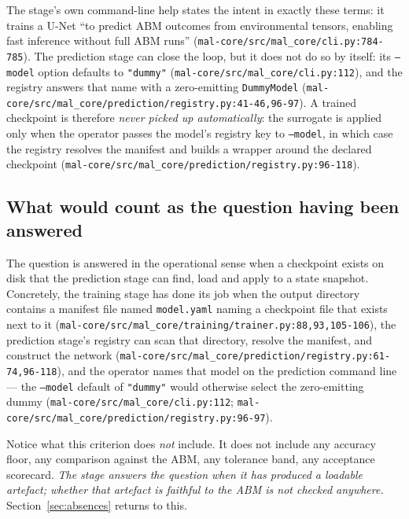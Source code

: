\documentclass[11pt,a4paper]{article}
\newcommand{\codex}[1]{\texttt{#1}}
\begin{document}
The stage's own command-line help states the intent in exactly these terms:
it trains a U-Net ``to predict ABM outcomes from environmental tensors,
enabling fast inference without full ABM runs''
(\codex{mal-core/\allowbreak{}src/\allowbreak{}mal\_\allowbreak{}core/\allowbreak{}cli.py:784-785}). The prediction stage can close the
loop, but it does not do so by itself: its \codex{--model} option defaults to
\codex{"dummy"}
(\codex{mal-core/\allowbreak{}src/\allowbreak{}mal\_\allowbreak{}core/\allowbreak{}cli.py:112}), and the registry answers that name with a
zero-emitting \codex{DummyModel}
(\codex{mal-core/\allowbreak{}src/\allowbreak{}mal\_\allowbreak{}core/\allowbreak{}prediction/\allowbreak{}registry.py:41-46,96-97}). A trained
checkpoint is therefore \emph{never picked up automatically}: the surrogate
is applied only when the operator passes the model's registry key to
\codex{--model}, in which case the registry resolves the manifest and builds
a wrapper around the declared checkpoint
(\codex{mal-core/\allowbreak{}src/\allowbreak{}mal\_\allowbreak{}core/\allowbreak{}prediction/\allowbreak{}registry.py:96-118}).

\subsection{What would count as the question having been answered}

The question is answered in the operational sense when a checkpoint exists on
disk that the prediction stage can find, load and apply to a state snapshot.
Concretely, the training stage has done its job when the output directory
contains a manifest file named \codex{model.yaml} naming a checkpoint file that
exists next to it (\codex{mal-core/\allowbreak{}src/\allowbreak{}mal\_\allowbreak{}core/\allowbreak{}training/\allowbreak{}trainer.py:88,93,105-106}),
the prediction stage's registry can scan that directory, resolve the
manifest, and construct the network (\codex{mal-core/\allowbreak{}src/\allowbreak{}mal\_\allowbreak{}core/\allowbreak{}prediction/\allowbreak{}registry.py:61-74,96-118}),
and the operator names that model on the prediction command line --- the
\codex{--model} default of \codex{"dummy"} would otherwise select the
zero-emitting dummy
(\codex{mal-core/\allowbreak{}src/\allowbreak{}mal\_\allowbreak{}core/\allowbreak{}cli.py:112};
\codex{mal-core/\allowbreak{}src/\allowbreak{}mal\_\allowbreak{}core/\allowbreak{}prediction/\allowbreak{}registry.py:96-97}).

Notice what this criterion does \emph{not} include. It does not include any
accuracy floor, any comparison against the ABM, any tolerance band, any
acceptance scorecard. \emph{The stage answers the question when it has produced
a loadable artefact; whether that artefact is faithful to the ABM is not
checked anywhere.} Section~\ref{sec:absences} returns to this.
\end{document}
